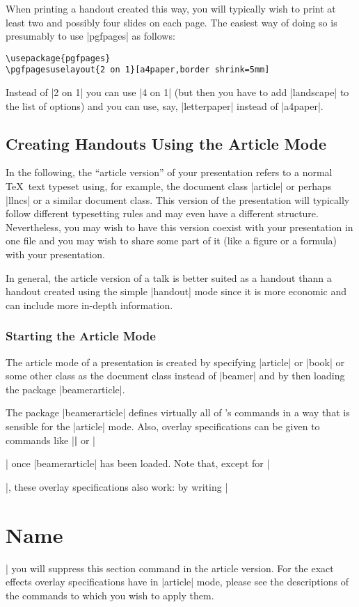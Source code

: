 When printing a handout created this way, you will typically wish to print at least two and possibly four slides on each page. The easiest way of doing so is presumably to use |pgfpages| as follows:

\begin{verbatim}
\usepackage{pgfpages}
\pgfpagesuselayout{2 on 1}[a4paper,border shrink=5mm]
\end{verbatim}

Instead of |2 on 1| you can use |4 on 1| (but then you have to add |landscape| to the list of options) and you can use, say, |letterpaper| instead of |a4paper|.


\subsection{Creating Handouts Using the Article Mode}
\label{section-article}

In the following, the ``article version'' of your presentation refers to a normal \TeX\ text typeset using, for example, the document class |article| or perhaps |llncs| or a similar document class. This version of the presentation will typically follow different typesetting rules and may even have a different structure. Nevertheless, you may wish to have this version coexist with your presentation in one file and you may wish to share some part of it (like a figure or a formula) with your presentation.

In general, the article version of a talk is better suited as a handout thann a handout created using the simple |handout| mode since it is more economic and can include more in-depth information.

\subsubsection{Starting the Article Mode}

The article mode of a presentation is created by specifying |article| or |book| or some other class as the document class instead of |beamer| and by then loading the package |beamerarticle|.

The package |beamerarticle| defines virtually all of \beamer's commands in a way that is sensible for the |article| mode. Also, overlay specifications can be given to commands like |\textbf| or |\item| once |beamerarticle| has been loaded. Note that, except for |\item|, these overlay specifications also work: by writing |\section<presentation>{Name}| you will suppress this section command in the article version. For the exact effects overlay specifications have in |article| mode, please see the descriptions of the commands to which you wish to apply them.

